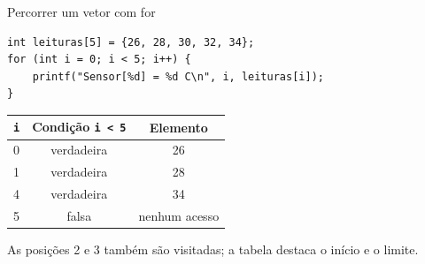 \begin{frame}[fragile]{Percorrer um vetor com for}
\begin{lstlisting}
int leituras[5] = {26, 28, 30, 32, 34};
for (int i = 0; i < 5; i++) {
    printf("Sensor[%d] = %d C\n", i, leituras[i]);
}
\end{lstlisting}
\begin{center}
\begin{tabular}{ccc}
\toprule
\texttt{i} & Condição \texttt{i < 5} & Elemento \\
\midrule
0 & verdadeira & 26 \\
1 & verdadeira & 28 \\
4 & verdadeira & 34 \\
5 & falsa & nenhum acesso \\
\bottomrule
\end{tabular}
\end{center}
\small As posições 2 e 3 também são visitadas; a tabela destaca o início e o limite.
\end{frame}
